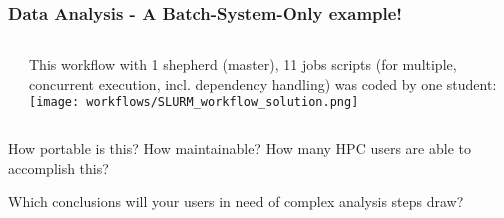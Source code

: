 \begin{frame}
	\frametitle{Data Analysis - A Batch-System-Only example!}
	\vspace{-2em}
	\begin{columns}[onlywidth,T]
		\begin{column}{0.5\textwidth}
		\end{column}
	    \begin{column}{0.5\textwidth}
	    	\vspace{1em}
	    This workflow with 1 shepherd (master), 11 jobs scripts (for multiple, concurrent execution, incl. dependency handling) was coded by one student:
	    \texttt{[image: workflows/SLURM\_workflow\_solution.png]}
	    \end{column}	
	\end{columns}
	\vspace{-12.5em}
	\begin{columns}
		\begin{column}{0.5\textwidth}
			  \pause
			\begin{question}
				How portable is this? How maintainable? How many HPC users are able to accomplish this?\\\pause\hline\vspace{0.5em}
				
				Which conclusions will your users in need of complex analysis steps draw?
			\end{question}	
		\end{column}
		\begin{column}{0.5\textwidth}
		\end{column}
	\end{columns}
\end{frame}	

